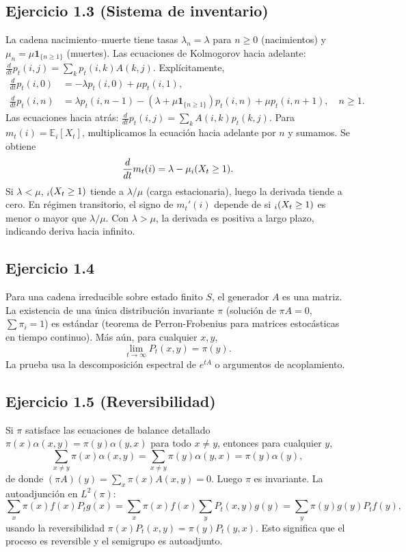 \documentclass[12pt]{article}
\let\P\relax
\newcommand{\P}{\mathbb{P}}
\newcommand{\E}{\mathbb{E}}
\newcommand{\1}{\mathbf{1}}
\begin{document}
\subsection{Ejercicio 1.3 (Sistema de inventario)}
La cadena nacimiento--muerte tiene tasas $\lambda_n=\lambda$ para $n\ge0$ (nacimientos) y $\mu_n=\mu\1_{\{n\ge1\}}$ (muertes). Las ecuaciones de Kolmogorov hacia adelante: $\frac{d}{dt}p_t(i,j)=\sum_k p_t(i,k)A(k,j)$. Expl\'icitamente,
\[
\begin{aligned}
\frac{d}{dt}p_t(i,0)&=-\lambda p_t(i,0)+\mu p_t(i,1),\\
\frac{d}{dt}p_t(i,n)&=\lambda p_t(i,n-1)-(\lambda+\mu\1_{\{n\ge1\}})p_t(i,n)+\mu p_t(i,n+1),\quad n\ge1.
\end{aligned}
\]
Las ecuaciones hacia atr\'as: $\frac{d}{dt}p_t(i,j)=\sum_k A(i,k)p_t(k,j)$.
Para $m_t(i)=\E_i[X_t]$, multiplicamos la ecuaci\'on hacia adelante por $n$ y sumamos. Se obtiene
\[
\frac{d}{dt}m_t(i)=\lambda-\mu\P_i(X_t\ge1).
\]
Si $\lambda<\mu$, $\P_i(X_t\ge1)$ tiende a $\lambda/\mu$ (carga estacionaria), luego la derivada tiende a cero. En r\'egimen transitorio, el signo de $m_t'(i)$ depende de si $\P_i(X_t\ge1)$ es menor o mayor que $\lambda/\mu$. Con $\lambda>\mu$, la derivada es positiva a largo plazo, indicando deriva hacia infinito.

\subsection{Ejercicio 1.4}
Para una cadena irreducible sobre estado finito $S$, el generador $A$ es una matriz. La existencia de una \'unica distribuci\'on invariante $\pi$ (soluci\'on de $\pi A=0$, $\sum\pi_i=1$) es est\'andar (teorema de Perron-Frobenius para matrices estoc\'asticas en tiempo continuo). M\'as a\'un, para cualquier $x,y$,
\[
\lim_{t\to\infty}P_t(x,y)=\pi(y).
\]
La prueba usa la descomposici\'on espectral de $e^{tA}$ o argumentos de acoplamiento.

\subsection{Ejercicio 1.5 (Reversibilidad)}
Si $\pi$ satisface las ecuaciones de balance detallado $\pi(x)\alpha(x,y)=\pi(y)\alpha(y,x)$ para todo $x\neq y$, entonces para cualquier $y$,
\[
\sum_{x\neq y}\pi(x)\alpha(x,y)=\sum_{x\neq y}\pi(y)\alpha(y,x)=\pi(y)\alpha(y),
\]
de donde $(\pi A)(y)=\sum_x\pi(x)A(x,y)=0$. Luego $\pi$ es invariante. La autoadjunci\'on en $L^2(\pi)$:
\[
\sum_x\pi(x)f(x)P_tg(x)=\sum_x\pi(x)f(x)\sum_y P_t(x,y)g(y)=\sum_y\pi(y)g(y)P_tf(y),
\]
usando la reversibilidad $\pi(x)P_t(x,y)=\pi(y)P_t(y,x)$. Esto significa que el proceso es reversible y el semigrupo es autoadjunto.
\end{document}
